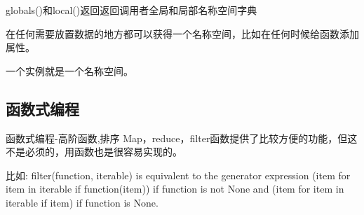 \documentclass[twoside,11pt]{book}
\begin{document}
globals()和local()返回返回调用者全局和局部名称空间字典

在任何需要放置数据的地方都可以获得一个名称空间，比如在任何时候给函数添加属性。

一个实例就是一个名称空间。


\subsection{函数式编程}

函数式编程-高阶函数,排序
Map，reduce，filter函数提供了比较方便的功能，但这不是必须的，用函数也是很容易实现的。

比如:
filter(function, iterable) is equivalent to the generator expression
(item for item in iterable if function(item)) if function is not None
and
(item for item in iterable if item) if function is None.
\end{document}
